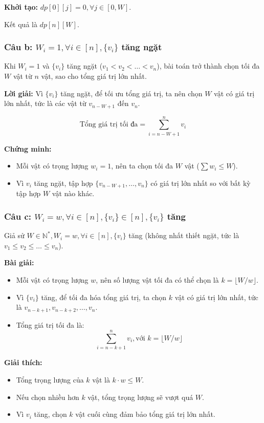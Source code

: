 \documentclass[a4paper,12pt]{article}
\begin{document}
\textbf{Khởi tạo:} \( dp[0][j] = 0, \forall j \in [0, W] \).

Kết quả là \( dp[n][W] \).

\subsubsection*{Câu b: \( W_i = 1, \forall i \in [n], \{v_i\} \) tăng ngặt}
Khi \( W_i = 1 \) và \( \{v_i\} \) tăng ngặt (\( v_1 < v_2 < \dots < v_n \)), bài toán trở thành chọn tối đa \( W \) vật từ \( n \) vật, sao cho tổng giá trị lớn nhất.

\textbf{Lời giải:} Vì \( \{v_i\} \) tăng ngặt, để tối ưu tổng giá trị, ta nên chọn \( W \) vật có giá trị lớn nhất, tức là các vật từ \( v_{n-W+1} \) đến \( v_n \).

\[
\text{Tổng giá trị tối đa} = \sum_{i=n-W+1}^{n} v_i
\]

\textbf{Chứng minh:} 
\begin{itemize}
    \item Mỗi vật có trọng lượng \( w_i = 1 \), nên ta chọn tối đa \( W \) vật (\( \sum w_i \leq W \)).
    \item Vì \( v_i \) tăng ngặt, tập hợp \( \{v_{n-W+1}, \dots, v_n\} \) có giá trị lớn nhất so với bất kỳ tập hợp \( W \) vật nào khác.
\end{itemize}

\subsubsection*{Câu c: \( W_i = w, \forall i \in [n], \{v_i\} \in [n], \{v_i\} \) tăng}
Giả sử \( W \in \mathbb{N}^*, W_i = w, \forall i \in [n], \{v_i\} \) tăng (không nhất thiết ngặt, tức là \( v_1 \leq v_2 \leq \dots \leq v_n \)).

\textbf{Bài giải:} 
\begin{itemize}
    \item Mỗi vật có trọng lượng \( w \), nên số lượng vật tối đa có thể chọn là \( k = \lfloor W/w \rfloor \).
    \item Vì \( \{v_i\} \) tăng, để tối đa hóa tổng giá trị, ta chọn \( k \) vật có giá trị lớn nhất, tức là \( v_{n-k+1}, v_{n-k+2}, \dots, v_n \).
    \item Tổng giá trị tối đa là:
    \[
    \sum_{i=n-k+1}^{n} v_i, \text{với } k = \lfloor W/w \rfloor
    \]
\end{itemize}

\textbf{Giải thích:} 
\begin{itemize}
    \item Tổng trọng lượng của \( k \) vật là \( k \cdot w \leq W \).
    \item Nếu chọn nhiều hơn \( k \) vật, tổng trọng lượng sẽ vượt quá \( W \).
    \item Vì \( v_i \) tăng, chọn \( k \) vật cuối cùng đảm bảo tổng giá trị lớn nhất.
\end{itemize}
\end{document}
